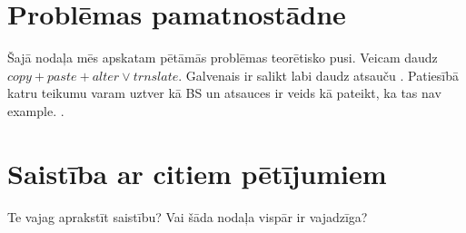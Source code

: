 \section{Problēmas pamatnostādne}
Šajā nodaļa mēs apskatam pētāmās problēmas teorētisko pusi.
Veicam daudz $copy + paste + alter \vee trnslate$.
Galvenais ir salikt labi daudz atsauču \cite{kant2018recent}.
Patiesībā katru teikumu varam uztver kā BS un atsauces ir veids kā pateikt, ka tas nav \gls{example}.
.

\section{Saistība ar citiem pētījumiem}

Te vajag aprakstīt saistību?
Vai šāda nodaļa vispār ir vajadzīga?